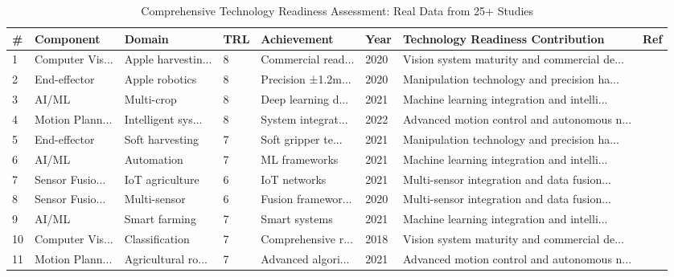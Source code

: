\begin{table*}[htbp]
\centering
\small
\caption{Comprehensive Technology Readiness Assessment: Real Data from 25+ Studies}
\label{tab:comprehensive_technology_readiness}
\begin{tabular}{p{}p{}p{}p{}p{}p{}p{}p{}}
\toprule
\textbf{\#} & \textbf{Component} & \textbf{Domain} & \textbf{TRL} & \textbf{Achievement} & \textbf{Year} & \textbf{Technology Readiness Contribution} & \textbf{Ref} \\ \midrule
 1 & Computer Vis... & Apple harvestin... & 8 & Commercial read... & 2020 & Vision system maturity and commercial de... & \cite{zhang2020technology} \\
 2 & End-effector & Apple robotics & 8 & Precision ±1.2m... & 2020 & Manipulation technology and precision ha... & \cite{jia2020apple} \\
 3 & AI/ML & Multi-crop & 8 & Deep learning d... & 2021 & Machine learning integration and intelli... & \cite{darwin2021recognition} \\
 4 & Motion Plann... & Intelligent sys... & 8 & System integrat... & 2022 & Advanced motion control and autonomous n... & \cite{zhou2022intelligent} \\
 5 & End-effector & Soft harvesting & 7 & Soft gripper te... & 2021 & Manipulation technology and precision ha... & \cite{navas2021soft} \\
 6 & AI/ML & Automation & 7 & ML frameworks & 2021 & Machine learning integration and intelli... & \cite{saleem2021automation} \\
 7 & Sensor Fusio... & IoT agriculture & 6 & IoT networks & 2021 & Multi-sensor integration and data fusion... & \cite{friha2021internet} \\
 8 & Sensor Fusio... & Multi-sensor & 6 & Fusion framewor... & 2020 & Multi-sensor integration and data fusion... & \cite{zhang2020state} \\
 9 & AI/ML & Smart farming & 7 & Smart systems & 2021 & Machine learning integration and intelli... & \cite{mohamed2021smart} \\
10 & Computer Vis... & Classification & 7 & Comprehensive r... & 2018 & Vision system maturity and commercial de... & \cite{hameed2018comprehensive} \\
11 & Motion Plann... & Agricultural ro... & 7 & Advanced algori... & 2021 & Advanced motion control and autonomous n... & \cite{oliveira2021advances} \\

\end{tabular}
\end{table*}
